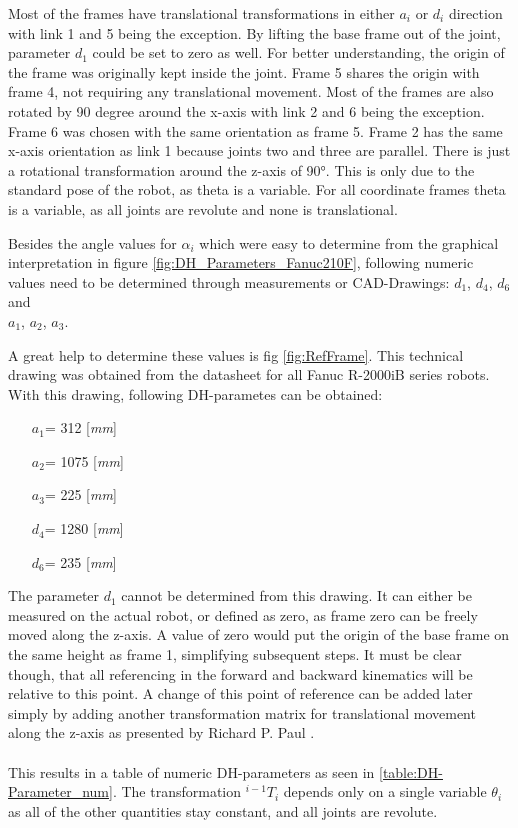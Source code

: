 Most of the frames have translational transformations in either $a_i$ or $d_i$ direction with link 1 and 5 being the exception.
By lifting the base frame out of the joint, parameter $d_1$ could be set to zero as well. For better understanding, the origin of the frame was originally kept inside the joint.
Frame 5 shares the origin with frame 4, not requiring any translational movement.
Most of the frames are also rotated by 90 degree around the x-axis with link 2 and 6 being the exception. Frame 6 was chosen with the same orientation as frame 5. Frame 2 has the same x-axis orientation as link 1 because joints two and three are parallel. There is just a rotational transformation around the z-axis of 90°. This is only due to the standard pose of the robot, as theta is a variable.
For all coordinate frames theta is a variable, as all joints are revolute and none is translational. 

Besides the angle values for $\alpha_i$ which were easy to determine from the graphical interpretation in figure \ref{fig:DH_Parameters_Fanuc210F}, following numeric values need to be determined through measurements or CAD-Drawings:
$d_1$, $d_4$, $d_6$ and \\
$a_1$, $a_2$, $a_3$. 

A great help to determine these values is fig \ref{fig:RefFrame}. This technical drawing was obtained from the datasheet for all Fanuc R-2000iB series robots. 
With this drawing, following \ac{DH}-parametes can be obtained:

\begin{itemize}\label{item:DH-LinparamValues}
	\item[$a_1$=] 312 [\textit{mm}]
	\item[$a_2$=] 1075 [\textit{mm}]
	\item[$a_3$=] 225 [\textit{mm}]
	\item[$d_4$=] 1280 [\textit{mm}]
	\item[$d_6$=] 235 [\textit{mm}]
\end{itemize}

The parameter $d_1$ cannot be determined from this drawing. It can either be measured on the actual robot, or defined as zero, as frame zero can be freely moved along the z-axis. A value of zero would put the origin of the base frame on the same height as frame 1, simplifying subsequent steps. 
It must be clear though, that all referencing in the forward and backward kinematics will be relative to this point. 
A change of this point of reference can be added later simply by adding another transformation matrix for translational movement along the z-axis as presented by Richard P. Paul \cite{Paul1981RobotM}.\\
\\
This results in a table of numeric DH-parameters as seen in \ref{table:DH-Parameter_num}. The transformation $^{i-1}T_i$ depends only on a single variable $\theta_i$ as all of the other quantities stay constant, and all joints are revolute.

